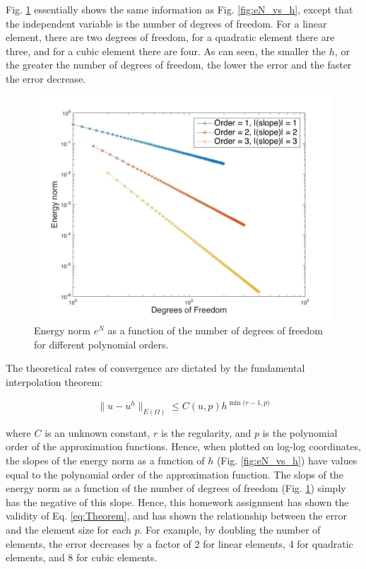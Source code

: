 \documentclass[10pt]{article}
\begin{document}
Fig. \ref{fig:eN_vs_dof} essentially shows the same information as Fig. \ref{fig:eN_vs_h}, except that the independent variable is the number of degrees of freedom. For a linear element, there are two degrees of freedom, for a quadratic element there are three, and for a cubic element there are four. As can seen, the smaller the \(h\), or the greater the number of degrees of freedom, the lower the error and the faster the error decrease.

\begin{figure}[H]
  \centering
  \includegraphics[width=13cm]{eN_vs_dof.jpg}
  \caption{Energy norm \(e^N\) as a function of the number of degrees of freedom for different polynomial orders.}
  \label{fig:eN_vs_dof}
\end{figure}

The theoretical rates of convergence are dictated by the fundamental interpolation theorem:

\begin{equation}
\label{eq:Theorem}
\|u-u^h\|_{E(\Omega)}\leq C(u, p)h^{\min{(r-1, p})}
\end{equation}

where \(C\) is an unknown constant, \(r\) is the regularity, and \(p\) is the polynomial order of the approximation functions. Hence, when plotted on log-log coordinates, the slopes of the energy norm as a function of \(h\) (Fig. \ref{fig:eN_vs_h}) have values equal to the polynomial order of the approximation function. The slops of the energy norm as a function of the number of degrees of freedom (Fig. \ref{fig:eN_vs_dof}) simply has the negative of this slope. Hence, this homework assignment has shown the validity of Eq. \eqref{eq:Theorem}, and has shown the relationship between the error and the element size for each \(p\). For example, by doubling the number of elements, the error decreases by a factor of 2 for linear elements, 4 for quadratic elements, and 8 for cubic elements. 
\end{document}
